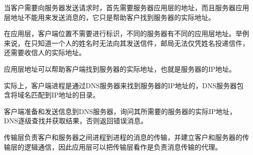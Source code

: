 当客户需要向服务器发送请求时，首先需要服务器应用层的地址，而且服务器应用层地址不能用来发送消息的，它只是帮助客户找到服务器的实际地址。

在应用层，客户端位置不需要进行标识，不同的服务器有不同的应用层地址。举例来说，在只知道一个人的姓名时无法向其发送信件，邮局无法仅凭姓名投递信件，还需要收信人的实际地址。

应用层地址可以帮助客户端找到服务器的实际地址，也就是服务器的IP地址。

实际上，客户端进程是通过DNS服务器来找到服务器的IP地址的，DNS服务器包含将域名匹配到IP地址的目录。

客户端准备和发送信息到DNS服务器，询问其所需要的服务器的实际IP地址，DNS逐级查找并获取结果，否则返回错误消息。

传输层负责客户和服务器之间进程到进程的消息的传输，并建立客户和服务器的传输层的逻辑通信，因此应用层可以把传输层看作是负责消息传输的代理。
















































